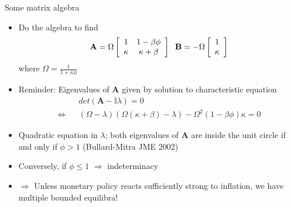 \documentclass[9pt,xcolor={dvipsnames}]{beamer}
\newcommand{\bit}{\begin{itemize}}
\newcommand{\eit}{\end{itemize}}
\begin{document}
\begin{frame}{Some matrix algebra}

\bit
\setlength\itemsep{1.2em}
\item Do the algebra to find \begin{eqnarray}
\mathbf A = \Omega \left[\begin{array}{cc}
1 & 1-\beta \phi \\
\kappa & \kappa + \beta
\end{array}\right] \hspace{2mm} \mathbf B = -\Omega \left[\begin{array}{c}
1  \\
\kappa 
\end{array}\right] \nonumber
\end{eqnarray}
where $\Omega = \frac{1}{1+\kappa \phi}$

\item Reminder: Eigenvalues of $\mathbf A$ given by solution to characteristic equation
\begin{eqnarray}
&& det(\mathbf{A}-\mathbb{I}\lambda)=0 \nonumber \\
\Leftrightarrow && (\Omega-\lambda)(\Omega(\kappa+\beta)-\lambda) - \Omega^2(1-\beta\phi)\kappa = 0 \nonumber
\end{eqnarray}

\item Quadratic equation in $\lambda$; both eigenvalues of $\mathbf A $ are inside the unit circle if and only if $\phi>1$ (Bullard-Mitra JME 2002)

\item Conversely, if $\phi \leq 1$ $\Rightarrow$ indeterminacy

\item $\Rightarrow$ Unless monetary policy reacts sufficiently strong to inflation, we have multiple bounded equilibra!

\eit

\end{frame}
\end{document}
